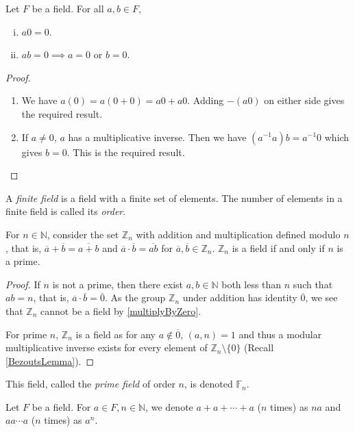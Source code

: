 \begin{theorem}
\label{multiplyByZero}
    Let $F$ be a field. For all $a,b\in F$,
    \begin{enumerate}[(i)]
        \item $a0=0$.
        \item $ab=0\implies a=0$ or $b=0$.
    \end{enumerate}
\end{theorem}
\begin{proof}
\phantom{owo}
\begin{enumerate}
    \item We have $a(0)=a(0+0)=a0+a0$. Adding $-(a0)$ on either side gives the required result.
    \item If $a\neq 0$, $a$ has a multiplicative inverse. Then we have $(a^{-1}a)b=a^{-1}0$ which gives $b=0$. This is the required result.
\end{enumerate}
\end{proof}

A \textit{finite field} is a field with a finite set of elements. The number of elements in a finite field is called its \textit{order}.

\begin{theorem}
    For $n\in\mathbb{N}$, consider the set $\mathbb{Z}_n$ with addition and multiplication defined modulo $n$, that is, $\overline{a}+\overline{b}=\overline{a+b}$ and $\overline{a}\cdot\overline{b}=\overline{ab}$ for $\overline{a}, \overline{b}\in\mathbb{Z}_n$. $\mathbb{Z}_n$ is a field if and only if $n$ is a prime.
\end{theorem}
\begin{proof}
If $n$ is not a prime, then there exist $a,b\in\mathbb{N}$ both less than $n$ such that $ab=n$, that is, $\overline{a}\cdot\overline{b}=\overline{0}$. As the group $\mathbb{Z}_n$ under addition has identity $\overline{0}$, we see that $\mathbb{Z}_n$ cannot be a field by \ref{multiplyByZero}.

For prime $n$, $\mathbb{Z}_n$ is a field as for any $a\not\in \overline{0}$, $(a,n)=1$ and thus a modular multiplicative inverse exists for every element of $\mathbb{Z}_n\setminus\{0\}$ (Recall \ref{BezoutsLemma}).
\end{proof}

This field, called the \textit{prime field} of order $n$, is denoted $\mathbb{F}_n$.

\vspace{2mm}
Let $F$ be a field. For $a\in F, n\in\mathbb{N}$, we denote $a+a+\cdots+a$ ($n$ times) as $na$ and $aa\cdots a$ ($n$ times) as $a^n$.

